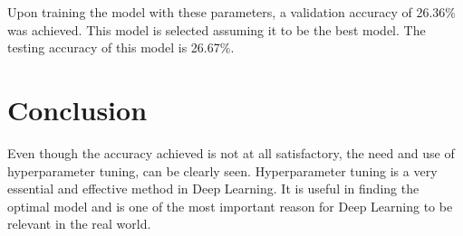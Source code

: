 \documentclass[conference,compsoc]{IEEEtran}
\begin{document}
Upon training the model with these parameters, a validation accuracy of 26.36\% was achieved. This model is selected assuming it to be the best model. The testing accuracy of this model is 26.67\%.

\section{Conclusion}
Even though the accuracy achieved is not at all satisfactory, the need and use of hyperparameter tuning, can be clearly seen. Hyperparameter tuning is a very essential and effective method in Deep Learning. It is useful in finding the optimal model and is one of the most important reason for Deep Learning to be relevant in the real world.
\end{document}
